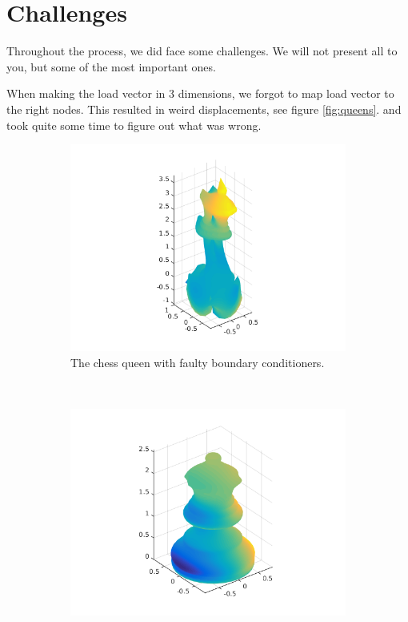 \section{Challenges}

Throughout the process, we did face some challenges. We will not present all to you, but some of the most important ones. 

When making the load vector in 3 dimensions, we forgot to map load vector to the right nodes. This resulted in weird displacements, see figure \ref{fig:queens}. and took quite some time to figure out what was wrong. 


\begin{figure}[ht]
        \centering
        \begin{subfigure}[b]{0.45 \textwidth}
                \includegraphics[width=\textwidth]{queen_broken}
                \caption{The chess queen with faulty boundary conditioners.}
        \end{subfigure}
        ~
        \begin{subfigure}[b]{0.45 \textwidth}
                \includegraphics[width=\textwidth]{queen_fixed}

\end{subfigure}
\end{figure}
